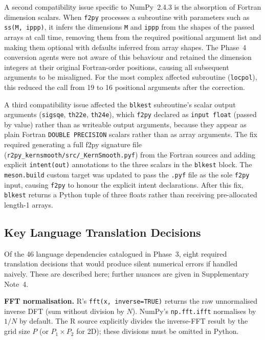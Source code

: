 \documentclass[12pt,a4paper]{article}
\newcommand{\pkg}[1]{\texttt{#1}}
\newcommand{\suppnote}[1]{Supplementary Note~#1}
\begin{document}
A second compatibility issue specific to NumPy~2.4.3 is the absorption of Fortran dimension scalars. When \pkg{f2py} processes a subroutine with parameters such as \texttt{ss(M,~ippp)}, it infers the dimensions \texttt{M} and \texttt{ippp} from the shapes of the passed arrays at call time, removing them from the required positional argument list and making them optional with defaults inferred from array shapes. The Phase~4 conversion agents were not aware of this behaviour and retained the dimension integers at their original Fortran-order positions, causing all subsequent arguments to be misaligned. For the most complex affected subroutine (\texttt{locpol}), this reduced the call from 19 to 16 positional arguments after the correction.

A third compatibility issue affected the \texttt{blkest} subroutine's scalar output arguments (\texttt{sigsqe}, \texttt{th22e}, \texttt{th24e}), which \pkg{f2py} declared as \texttt{input float} (passed by value) rather than as writeable output arguments, because they appear as plain Fortran \texttt{DOUBLE PRECISION} scalars rather than as array arguments. The fix required generating a full f2py signature file (\texttt{r2py\_kernsmooth/src/\_KernSmooth.pyf}) from the Fortran sources and adding explicit \texttt{intent(out)} annotations to the three scalars in the \texttt{blkest} block. The \texttt{meson.build} custom target was updated to pass the \texttt{.pyf} file as the sole \pkg{f2py} input, causing \pkg{f2py} to honour the explicit intent declarations. After this fix, \texttt{blkest} returns a Python tuple of three floats rather than receiving pre-allocated length-1 arrays.

\subsection{Key Language Translation Decisions}

Of the 46 language dependencies catalogued in Phase~3, eight required translation decisions that would produce silent numerical errors if handled naively. These are described here; further nuances are given in \suppnote{4}.

\textbf{FFT normalisation.} R's \texttt{fft(x,~inverse=TRUE)} returns the raw unnormalised inverse DFT (sum without division by $N$). NumPy's \texttt{np.fft.ifft} normalises by $1/N$ by default. The R source explicitly divides the inverse-FFT result by the grid size $P$ (or $P_1 \times P_2$ for 2D); these divisions must be omitted in Python.
\end{document}
